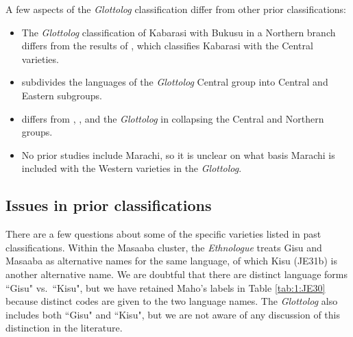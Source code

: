 \documentclass[output=paper]{langscibook}
\begin{document}
A few aspects of the \textit{Glottolog} classification differ from other prior classifications:

\begin{itemize}
    \item The \textit{Glottolog} classification of Kabarasi with Bukusu in a Northern branch differs from the results of \citet{williams_lexico-statistical_1973}, which classifies Kabarasi with the Central varieties.
    
    \item \citet{williams_lexico-statistical_1973} subdivides the languages of the \textit{Glottolog} Central group into Central and Eastern subgroups.
    
    \item \citet{heine_language_1980} differs from \citet{mould_comparative_1976,mould_greater_1981}, \citet{williams_lexico-statistical_1973}, and the \textit{Glottolog} in collapsing the Central and Northern groups.
    
    \item  No prior studies include Marachi, so it is unclear on what basis Marachi is included with the Western varieties in the \textit{Glottolog}.
    
\end{itemize}



\subsection{Issues in prior classifications}
\label{sec:2.5:Issues_in_prior_classifications}

There are a few questions about some of the specific varieties listed in past classifications. Within the Masaaba cluster, the \textit{Ethnologue} treats Gisu and Masaaba as alternative names for the same language, of which Kisu (JE31b) is another alternative name. We are doubtful that there are distinct language forms ``Gisu" vs.\ ``Kisu", but we have retained Maho's labels in Table \ref{tab:1:JE30} because distinct codes are given to the two language names. The \textit{Glottolog} also includes both ``Gisu" and ``Kisu", but we are not aware of any discussion of this distinction in the literature.
\end{document}
